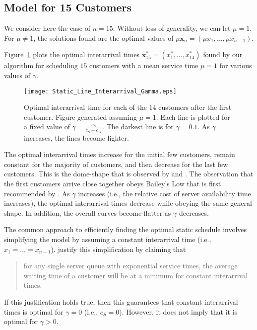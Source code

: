 \subsection{Model for 15 Customers}
We consider here the case of $n = 15$. Without loss of generality, we can let $\mu = 1$. For $\mu \neq 1$, the solutions found are the optimal values of $\mu \mathbf{x}_{n} = (\mu x_{1}, \ldots, \mu x_{n - 1})$.

Figure~\ref{fig:Static_Time_Gamma} plots the optimal interarrival times $\mathbf{x}_{15}^{*} = (x_{1}^{*}, \ldots, x_{14}^{*})$ found by our algorithm for scheduling $15$ customers with a mean service time $\mu = 1$ for various values of $\gamma$.
\begin{figure}[htb]
	\centering
	\texttt{[image: Static\_Line\_Interarrival\_Gamma.eps]}
	\caption{Optimal interarrival time for each of the $14$ customers after the first customer. Figure generated assuming $\mu = 1$. Each line is plotted for a fixed value of $\gamma = \frac{c_{S}}{c_{S} + c_{W}}$. The darkest line is for $\gamma = 0.1$. As $\gamma$ increases, the lines become lighter.}
	\label{fig:Static_Time_Gamma}
\end{figure}

The optimal interarrival times increase for the initial few customers, remain constant for the majority of customers, and then decrease for the last few customers. This is the dome-shape that is observed by \citet{Stein} and \citet{Mendel}. The observation that the first customers arrive close together obeys Bailey's Low that is first recommended by \citet{Bailey}. As $\gamma$ increases (i.e., the relative cost of server availability time increases), the optimal interarrival times decrease while obeying the same general shape. In addition, the overall curves become flatter as $\gamma$ decreases.

The common approach to efficiently finding the optimal static schedule involves simplifying the model by assuming a constant interarrival time (i.e., $x_{1} = \ldots = x_{n - 1}$). \citet{Stein} justify this simplification by claiming that
\begin{quote}
for any single server queue with exponential service times, the average waiting time of a customer will be at a minimum for constant interarrival times.
\end{quote}

If this justification holds true, then this guarantees that constant interarrival times is optimal for $\gamma = 0$ (i.e., $c_{S} = 0$). However, it does not imply that it is optimal for $\gamma > 0$.

